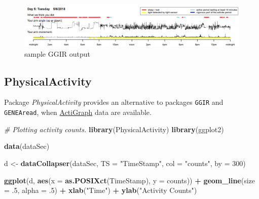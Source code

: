 \documentclass[]{book}
\newenvironment{Shaded}{\begin{snugshade}}{\end{snugshade}}
\newcommand{\KeywordTok}[1]{\textcolor[rgb]{0.13,0.29,0.53}{\textbf{#1}}}
\newcommand{\DataTypeTok}[1]{\textcolor[rgb]{0.13,0.29,0.53}{#1}}
\newcommand{\DecValTok}[1]{\textcolor[rgb]{0.00,0.00,0.81}{#1}}
\newcommand{\StringTok}[1]{\textcolor[rgb]{0.31,0.60,0.02}{#1}}
\newcommand{\CommentTok}[1]{\textcolor[rgb]{0.56,0.35,0.01}{\textit{#1}}}
\newcommand{\OperatorTok}[1]{\textcolor[rgb]{0.81,0.36,0.00}{\textbf{#1}}}
\newcommand{\NormalTok}[1]{#1}
\begin{document}
\begin{figure}

{\centering \includegraphics[width=1\linewidth]{images/catalogue_R/GGIR_pdf} 

}

\caption{sample GGIR output}\label{fig:GGIR-pdf}
\end{figure}

\subsection{PhysicalActivity}\label{physicalactivity}


Package \emph{PhysicalActivity} \citep{R-PhysicalActivity} provides an
alternative to packages \texttt{GGIR} and \texttt{GENEAread}, when
\href{https://actigraphcorp.com/}{ActiGraph} data are available.

\begin{Shaded}
\begin{Highlighting}[]
\CommentTok{# Plotting activity counts.}
\KeywordTok{library}\NormalTok{(PhysicalActivity)}
\KeywordTok{library}\NormalTok{(ggplot2)}

\KeywordTok{data}\NormalTok{(dataSec)}

\NormalTok{d <-}\StringTok{ }\KeywordTok{dataCollapser}\NormalTok{(dataSec, }\DataTypeTok{TS =} \StringTok{"TimeStamp"}\NormalTok{, }\DataTypeTok{col =} \StringTok{"counts"}\NormalTok{, }\DataTypeTok{by =} \DecValTok{300}\NormalTok{)}

\KeywordTok{ggplot}\NormalTok{(d, }\KeywordTok{aes}\NormalTok{(}\DataTypeTok{x =} \KeywordTok{as.POSIXct}\NormalTok{(TimeStamp), }\DataTypeTok{y =}\NormalTok{ counts)) }\OperatorTok{+}
\StringTok{  }\KeywordTok{geom_line}\NormalTok{(}\DataTypeTok{size =}\NormalTok{ .}\DecValTok{5}\NormalTok{, }\DataTypeTok{alpha =}\NormalTok{ .}\DecValTok{5}\NormalTok{) }\OperatorTok{+}
\StringTok{  }\KeywordTok{xlab}\NormalTok{(}\StringTok{"Time"}\NormalTok{) }\OperatorTok{+}\StringTok{ }\KeywordTok{ylab}\NormalTok{(}\StringTok{"Activity Counts"}\NormalTok{)}
\end{Highlighting}
\end{Shaded}
\end{document}
